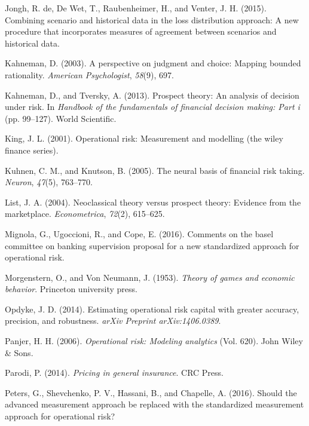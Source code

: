 \documentclass[]{DissertateUSU}
\begin{document}
\hypertarget{ref-de2015combining}{}
Jongh, R. de, De Wet, T., Raubenheimer, H., and Venter, J. H. (2015).
Combining scenario and historical data in the loss distribution
approach: A new procedure that incorporates measures of agreement
between scenarios and historical data.

\hypertarget{ref-kahneman2003perspective}{}
Kahneman, D. (2003). A perspective on judgment and choice: Mapping
bounded rationality. \emph{American Psychologist}, \emph{58}(9), 697.

\hypertarget{ref-kahneman2013prospect}{}
Kahneman, D., and Tversky, A. (2013). Prospect theory: An analysis of
decision under risk. In \emph{Handbook of the fundamentals of financial
decision making: Part i} (pp. 99--127). World Scientific.

\hypertarget{ref-king2001operational}{}
King, J. L. (2001). Operational risk: Measurement and modelling (the
wiley finance series).

\hypertarget{ref-kuhnen2005neural}{}
Kuhnen, C. M., and Knutson, B. (2005). The neural basis of financial
risk taking. \emph{Neuron}, \emph{47}(5), 763--770.

\hypertarget{ref-list2004neoclassical}{}
List, J. A. (2004). Neoclassical theory versus prospect theory: Evidence
from the marketplace. \emph{Econometrica}, \emph{72}(2), 615--625.

\hypertarget{ref-mignola2016comments}{}
Mignola, G., Ugoccioni, R., and Cope, E. (2016). Comments on the basel
committee on banking supervision proposal for a new standardized
approach for operational risk.

\hypertarget{ref-morgenstern1953theory}{}
Morgenstern, O., and Von Neumann, J. (1953). \emph{Theory of games and
economic behavior}. Princeton university press.

\hypertarget{ref-opdyke2014estimating}{}
Opdyke, J. D. (2014). Estimating operational risk capital with greater
accuracy, precision, and robustness. \emph{arXiv Preprint
arXiv:1406.0389}.

\hypertarget{ref-panjer2006operational}{}
Panjer, H. H. (2006). \emph{Operational risk: Modeling analytics} (Vol.
620). John Wiley \& Sons.

\hypertarget{ref-parodi2014pricing}{}
Parodi, P. (2014). \emph{Pricing in general insurance}. CRC Press.

\hypertarget{ref-peters2016should}{}
Peters, G., Shevchenko, P. V., Hassani, B., and Chapelle, A. (2016).
Should the advanced measurement approach be replaced with the
standardized measurement approach for operational risk?
\end{document}
